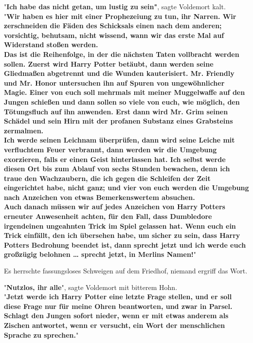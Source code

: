 {"\textbf{Ich habe das nicht getan, um lustig zu sein"}, sagte Voldemort kalt.\\ "\textbf{Wir haben es hier mit einer Prophezeiung zu tun, ihr Narren. Wir zerschneiden die Fäden des Schicksals einen nach dem anderen; vorsichtig, behutsam, nicht wissend, wann wir das erste Mal auf Widerstand stoßen werden.}\\ \textbf{\hfill\break Das ist die Reihenfolge, in der die nächsten Taten vollbracht werden sollen. Zuerst wird Harry Potter betäubt, dann werden seine Gliedmaßen abgetrennt und die Wunden kauterisiert. Mr. Friendly und Mr. Honor untersuchen ihn auf Spuren von ungewöhnlicher Magie. Einer von euch soll mehrmals mit meiner Muggelwaffe auf den Jungen schießen und dann sollen so viele von euch, wie möglich, den Tötungsfluch auf ihn anwenden. Erst dann wird Mr. Grim seinen Schädel und sein Hirn mit der profanen Substanz eines Grabsteins zermalmen.}\\ \textbf{\hfill\break Ich werde seinen Leichnam überprüfen, dann wird seine Leiche mit verfluchtem Feuer verbrannt, dann werden wir die Umgebung exorzieren, falls er einen Geist hinterlassen hat. Ich selbst werde diesen Ort bis zum Ablauf von sechs Stunden bewachen, denn ich traue den Wachzaubern, die ich gegen die Schleifen der Zeit eingerichtet habe, nicht ganz; und vier von euch werden die Umgebung nach Anzeichen von etwas Bemerkenswertem absuchen.}\\ \textbf{\hfill\break Auch danach müssen wir auf jedes Anzeichen von Harry Potters erneuter Anwesenheit achten, für den Fall, dass Dumbledore irgendeinen ungeahnten Trick im Spiel gelassen hat. Wenn euch ein Trick einfällt, den ich übersehen habe, um sicher zu sein, dass Harry Potters Bedrohung beendet ist, dann sprecht jetzt und ich werde euch großzügig belohnen … sprecht jetzt, in Merlins Namen!}"

Es herrschte fassungsloses Schweigen auf dem Friedhof, niemand ergriff das Wort.

"\textbf{Nutzlos, ihr alle}", sagte Voldemort mit bitterem Hohn.\\ "\textbf{Jetzt werde ich Harry Potter eine letzte Frage stellen, und er soll diese Frage nur für meine Ohren beantworten, und zwar in Parsel. Schlagt den Jungen sofort nieder, wenn er mit etwas anderem als Zischen antwortet, wenn er versucht, ein Wort der menschlichen Sprache zu sprechen.}"

}

